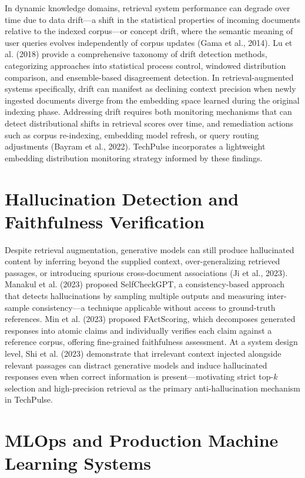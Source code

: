 \documentclass[12pt,a4paper]{report}
\begin{document}
In dynamic knowledge domains, retrieval system performance can degrade over time due to data drift—a shift in the statistical properties of incoming documents relative to the indexed corpus—or concept drift, where the semantic meaning of user queries evolves independently of corpus updates (Gama et al., 2014). Lu et al. (2018) provide a comprehensive taxonomy of drift detection methods, categorizing approaches into statistical process control, windowed distribution comparison, and ensemble-based disagreement detection. In retrieval-augmented systems specifically, drift can manifest as declining context precision when newly ingested documents diverge from the embedding space learned during the original indexing phase. Addressing drift requires both monitoring mechanisms that can detect distributional shifts in retrieval scores over time, and remediation actions such as corpus re-indexing, embedding model refresh, or query routing adjustments (Bayram et al., 2022). TechPulse incorporates a lightweight embedding distribution monitoring strategy informed by these findings.

\section{Hallucination Detection and Faithfulness Verification}
\label{sec:lit_hallucination}

Despite retrieval augmentation, generative models can still produce hallucinated content by inferring beyond the supplied context, over-generalizing retrieved passages, or introducing spurious cross-document associations (Ji et al., 2023). Manakul et al. (2023) proposed SelfCheckGPT, a consistency-based approach that detects hallucinations by sampling multiple outputs and measuring inter-sample consistency—a technique applicable without access to ground-truth references. Min et al. (2023) proposed FActScoring, which decomposes generated responses into atomic claims and individually verifies each claim against a reference corpus, offering fine-grained faithfulness assessment. At a system design level, Shi et al. (2023) demonstrate that irrelevant context injected alongside relevant passages can distract generative models and induce hallucinated responses even when correct information is present—motivating strict top-$k$ selection and high-precision retrieval as the primary anti-hallucination mechanism in TechPulse.

\section{MLOps and Production Machine Learning Systems}
\label{sec:lit_mlops}
\end{document}
